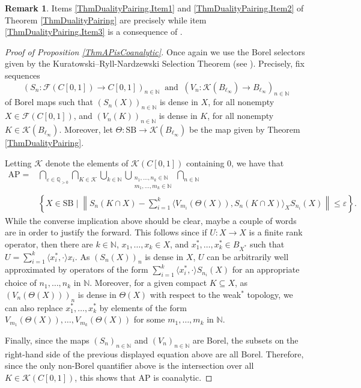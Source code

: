 \documentclass[letterpaper]{amsart}
\numberwithin{equation}{section}
\theoremstyle{definition}
\newtheorem{remark}[theorem]{Remark}
\newcommand{\N}{{\mathbb{N}}}
\newcommand{\Q}{{\mathbb{Q}}}
\newcommand{\SB}{\mathrm{SB}}
\newcommand{\AP}{\mathrm{AP}}
\newcommand{\eps}{\varepsilon}
\begin{document}
\begin{remark}
Items \eqref{ThmDualityPairing.Item1} and \eqref{ThmDualityPairing.Item2} of Theorem \ref{ThmDualityPairing} are precisely \cite[Theorem 1.3]{Braga2015AIFourier} while item  \eqref{ThmDualityPairing.Item3}   is a consequence of \cite[Lemma 3.2]{Braga2015AIFourier}. 
\end{remark}

\begin{proof}
    [Proof of Proposition \ref{ThmAPisCoanalytic}]
\setlength{\emergencystretch}{2em}%
Once again we use the Borel selectors given by the Kuratowski--Ryll-Nardzewski Selection Theorem (see \cite[12.13]{KechrisBook1995}). Precisely, fix sequences \[(S_n\colon \mathcal F(C[0,1])\to C[0,1])_{n\in \N}\ \text{ and }\ (V_n\colon\mathcal K( B_{\ell_\infty})\to B_{\ell_\infty})_{n\in \N}\]  of Borel maps such that 
$(S_n(X))_{n\in\N}$ is dense in $X$, for all nonempty $X\in \mathcal F(C[0,1])$, and $(V_n(K))_{n\in\N}$ is dense in $K$, for all nonempty $K\in \mathcal K(B_{\ell_{\infty}})$. Moreover, let $\Theta\colon \SB\to \mathcal K(B_{\ell_\infty})$ be the map given by Theorem \ref{ThmDualityPairing}. 

Letting $\mathcal K$ denote the elements of  $\mathcal K(C[0,1])$ containing $0$, we have that 
   \begin{align*}
\mathrm{AP}=&\bigcap_{\eps\in \Q_{>0}}         \bigcap_{K\in \mathcal K}\bigcup_{k\in\N}\bigcup_{\substack{ n_1,\ldots, n_k\in \N\\ m_1,\ldots, m_k\in \N}} \bigcap_{n\in\N}&\\
&\left\{X\in \SB\mid \left\|S_n(K\cap X)-\sum_{i=1}^k\langle V_{m_i}(\Theta(X)), S_n(K\cap X)\rangle_{X}S_{n_i}(X)\right\|\leq \eps\right\}.
    \end{align*}
While the converse implication above should be  clear, maybe a  couple of words are in order to justify the forward. This follows since if $U\colon X\to X$ is a finite rank operator, then there are $k\in\N$, $x_1,\ldots, x_k\in X$, and $x^*_1,\ldots,x^*_k\in B_{X^*}$ such that $U=\sum_{i=1}^k\langle x^*_i,\cdot\rangle x_i$. As $(S_{n}(X))_n$ is dense in $X$, $U$ can be arbitrarily well approximated by operators of the form $\sum_{i=1}^k\langle x^*_i,\cdot\rangle S_{n_i}(X)$ for an appropriate choice of $n_1,\ldots,n_k$ in $\N$. Moreover, for a given compact $K\subseteq X$, as $(V_n(\Theta(X)))_n$ is dense in $\Theta(X)$ with respect to the weak$^*$ topology, we can also replace $x^*_1,\ldots,x^*_k$ by elements of the form $V_{m_1}(\Theta(X)), \ldots, V_{m_k}(\Theta(X))$ for some $m_1,\ldots, m_k$ in $\N$. 

Finally, since the maps $(S_n)_{n\in\N}$ and $(V_n)_{n\in\N}$ are Borel, the subsets on the right-hand side of the previous displayed equation above are all Borel. Therefore, since the only non-Borel quantifier above is the intersection over all $K\in \mathcal K(C[0,1])$, this shows that $\AP$ is coanalytic.
\end{proof}
 
\end{document}
